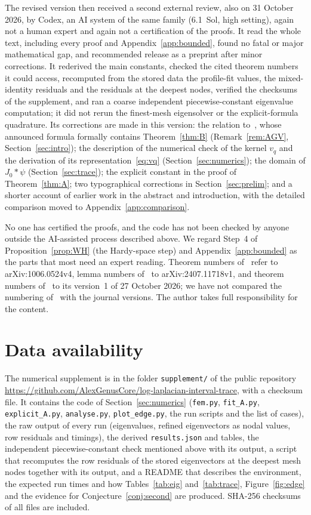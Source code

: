 \documentclass[11pt]{amsart}
\theoremstyle{definition}
\theoremstyle{remark}
\numberwithin{equation}{section}
\begin{document}
The revised version then received a second external review, also on 31 October 2026, by Codex, an AI system of the same family (6.1~Sol, high setting), again not a human expert and again not a certification of the proofs. It read the whole text, including every proof and Appendix~\ref{app:bounded}, found no fatal or major mathematical gap, and recommended release as a preprint after minor corrections. It rederived the main constants, checked the cited theorem numbers it could access, recomputed from the stored data the profile-fit values, the mixed-identity residuals and the residuals at the deepest nodes, verified the checksums of the supplement, and ran a coarse independent piecewise-constant eigenvalue computation; it did not rerun the finest-mesh eigensolver or the explicit-formula quadrature. Its corrections are made in this version: the relation to~\cite{AGV24}, whose announced formula formally contains Theorem~\ref{thm:B} (Remark~\ref{rem:AGV}, Section~\ref{sec:intro}); the description of the numerical check of the kernel $v_q$ and the derivation of its representation~\eqref{eq:vq} (Section~\ref{sec:numerics}); the domain of $J_0*\psi$ (Section~\ref{sec:trace}); the explicit constant in the proof of Theorem~\ref{thm:A}; two typographical corrections in Section~\ref{sec:prelim}; and a shorter account of earlier work in the abstract and introduction, with the detailed comparison moved to Appendix~\ref{app:comparison}.

No one has certified the proofs, and the code has not been checked by anyone outside the AI-assisted process described above. We regard Step~4 of Proposition~\ref{prop:WH} (the Hardy-space step) and Appendix~\ref{app:bounded} as the parts that most need an expert reading. Theorem numbers of~\cite{Kw11} refer to arXiv:1006.0524v4, lemma numbers of~\cite{PS25} to arXiv:2407.11718v1, and theorem numbers of~\cite{BT26} to its version~1 of 27 October 2026; we have not compared the numbering of~\cite{Kw11,PS25} with the journal versions. The author takes full responsibility for the content.

\section*{Data availability}
The numerical supplement is in the folder \texttt{supplement/} of the public repository \url{https://github.com/AlexGenusCore/log-laplacian-interval-trace}, with a checksum file. It contains the code of Section~\ref{sec:numerics} (\texttt{fem.py}, \texttt{fit\_A.py}, \texttt{explicit\_A.py}, \texttt{analyse.py}, \texttt{plot\_edge.py}, the run scripts and the list of cases), the raw output of every run (eigenvalues, refined eigenvectors as nodal values, row residuals and timings), the derived \texttt{results.json} and tables, the independent piecewise-constant check mentioned above with its output, a script that recomputes the row residuals of the stored eigenvectors at the deepest mesh nodes together with its output, and a README that describes the environment, the expected run times and how Tables~\ref{tab:eig} and~\ref{tab:trace}, Figure~\ref{fig:edge} and the evidence for Conjecture~\ref{conj:second} are produced. SHA-256 checksums of all files are included.
\end{document}
